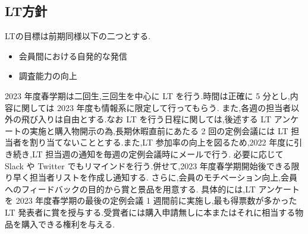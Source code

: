 \subsection*{LT方針}


LTの目標は前期同様以下の二つとする.
\begin{itemize}
    \item 会員間における自発的な発信
    \item 調査能力の向上
\end{itemize}
2023 年度春学期は二回生,三回生を中心に LT を行う.時間は正確に 5 分とし,内容に関しては 2023 年度も情報系に限定して行ってもらう.
また,各週の担当者以外の飛び入りは自由とする.なお LT を行う日程に関しては,後述する LT アンケートの実施と購入物開示の為,長期休暇直前にあたる 2 回の定例会議には LT 担当者を割り当てないこととする.また,LT 参加率の向上を図るため,2022 年度に引き続き,LT 担当週の通知を毎週の定例会議時にメールで行う.
必要に応じて Slack や Twitter でもリマインドを行う.併せて,2023 年度春学期開始後できる限り早く担当者リストを作成し通知する.
さらに,会員のモチベーション向上,会員へのフィードバックの目的から賞と景品を用意する.
具体的には,LT アンケートを 2023 年度春学期の最後の定例会議 1 週間前に実施し,最も得票数が多かった LT 発表者に賞を授与する.受賞者には購入申請無しに本またはそれに相当する物品を購入できる権利を与える.
